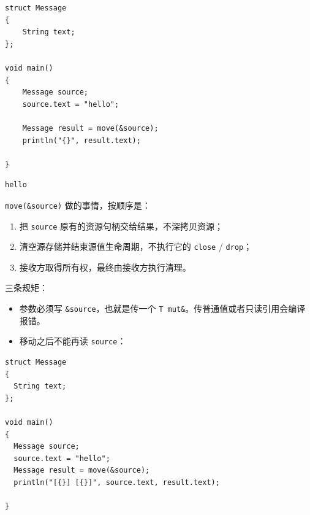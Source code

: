 \par
\medskip
\begin{lstlisting}[style=chali]
struct Message
{
    String text;
};

void main()
{
    Message source;
    source.text = "hello";

    Message result = move(&source);
    println("{}", result.text);

}
\end{lstlisting}
\par
\medskip

\par
\medskip
\begin{lstlisting}[style=out]
hello
\end{lstlisting}
\par
\medskip

\texttt{move(\allowbreak{}\&source)\allowbreak{}} 做的事情，按顺序是：

\begin{enumerate}

\item 把 \texttt{source} 原有的资源句柄交给结果，不深拷贝资源；

\item 清空源存储并结束源值生命周期，不执行它的 \texttt{close} / \texttt{drop}；

\item 接收方取得所有权，最终由接收方执行清理。

\end{enumerate}

三条规矩：

\begin{itemize}

\item 参数必须写 \texttt{\&source}，也就是传一个 \texttt{T mut\&}。传普通值或者只读引用会编译报错。

\item 移动之后不能再读 \texttt{source}：

\end{itemize}

\par
\medskip
\begin{lstlisting}[style=chali]
struct Message
{
  String text;
};

void main()
{
  Message source;
  source.text = "hello";
  Message result = move(&source);
  println("[{}] [{}]", source.text, result.text);

}
\end{lstlisting}
\par
\medskip

